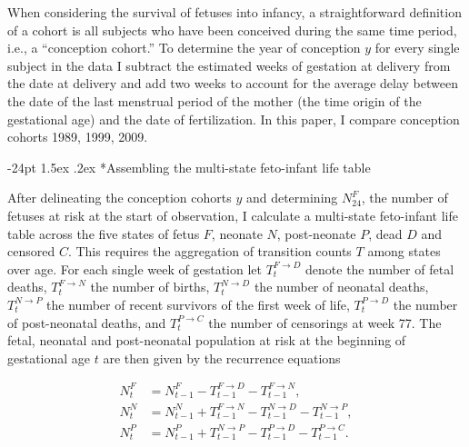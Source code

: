 \documentclass[10pt, twoside]{article}
\makeatletter
\renewcommand\subsection{\@startsection{subsection}{2}{\z@}%
                                     {-24pt}%
                                     {1.5ex \@plus .2ex}%
                                     {\normalfont\normalsize\bfseries}}
\makeatother
\begin{document}
When considering the survival of fetuses into infancy, a straightforward definition of a cohort is all subjects who have been conceived during the same time period, i.e., a ``conception cohort.'' To determine the year of conception \(y\) for every single subject in the data I subtract the estimated weeks of gestation at delivery from the date at delivery and add two weeks to account for the average delay between the date of the last menstrual period of the mother (the time origin of the gestational age) and the date of fertilization. In this paper, I compare conception cohorts 1989, 1999, 2009.

\hypertarget{assembling-the-multi-state-feto-infant-life-table}{%
\subsection*{Assembling the multi-state feto-infant life table}\label{assembling-the-multi-state-feto-infant-life-table}}

After delineating the conception cohorts \(y\) and determining \(N^{F}_{24}\), the number of fetuses at risk at the start of observation, I calculate a multi-state feto-infant life table across the five states of fetus \(F\), neonate \(N\), post-neonate \(P\), dead \(D\) and censored \(C\). This requires the aggregation of transition counts \(T\) among states over age. For each single week of gestation let \(T_{t}^{F\rightarrow D}\) denote the number of fetal deaths, \(T_{t}^{F\rightarrow N}\) the number of births, \(T_{t}^{N\rightarrow D}\) the number of neonatal deaths, \(T_{t}^{N\rightarrow P}\) the number of recent survivors of the first week of life, \(T_{t}^{P\rightarrow D}\) the number of post-neonatal deaths, and \(T_{t}^{P\rightarrow C}\) the number of censorings at week 77. The fetal, neonatal and post-neonatal population at risk at the beginning of gestational age \(t\) are then given by the recurrence equations

\[
\begin{aligned}
N_{t}^{F} &= N_{t-1}^{F} - T_{t-1}^{F\rightarrow D} - T_{t-1}^{F\rightarrow N}, \\
N_{t}^{N} &= N_{t-1}^{N} + T_{t-1}^{F\rightarrow N} - T_{t-1}^{N\rightarrow D} - T_{t-1}^{N\rightarrow P}, \\
N_{t}^{P} &= N_{t-1}^{P} + T_{t-1}^{N\rightarrow P} - T_{t-1}^{P\rightarrow D} - T_{t-1}^{P\rightarrow C}.
\end{aligned}
\]
\end{document}
